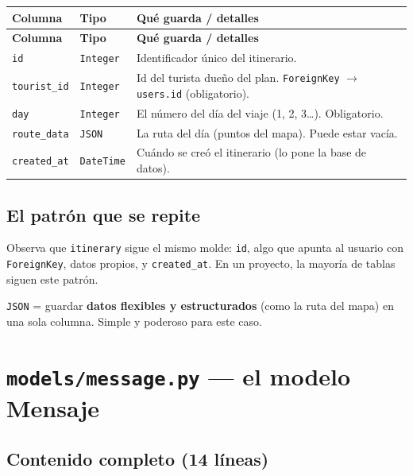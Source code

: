 \documentclass[11pt,a4paper]{article}
\begin{document}
\begin{center}
{\small
\setlength{\tabcolsep}{4pt}
\begin{longtable}{@{}>{\raggedright\arraybackslash}p{3.4cm}>{\raggedright\arraybackslash}p{3cm}>{\raggedright\arraybackslash}p{8.5cm}@{}}
\toprule
\textbf{Columna} & \textbf{Tipo} & \textbf{Qué guarda / detalles} \\
\midrule
\endfirsthead
\toprule
\textbf{Columna} & \textbf{Tipo} & \textbf{Qué guarda / detalles} \\
\midrule
\endhead
\texttt{id} & \texttt{Integer} & Identificador único del itinerario. \\
\texttt{tourist\_id} & \texttt{Integer} & Id del turista dueño del plan. \texttt{ForeignKey} $\rightarrow$ \texttt{users.id} (obligatorio). \\
\texttt{day} & \texttt{Integer} & El número del día del viaje (1, 2, 3\ldots). Obligatorio. \\
\texttt{route\_data} & \texttt{JSON} & La ruta del día (puntos del mapa). Puede estar vacía. \\
\texttt{created\_at} & \texttt{DateTime} & Cuándo se creó el itinerario (lo pone la base de datos). \\
\bottomrule
\end{longtable}
}
\end{center}

\subsection{El patrón que se repite}

Observa que \texttt{itinerary} sigue el mismo molde: \texttt{id}, algo que apunta al usuario
con \texttt{ForeignKey}, datos propios, y \texttt{created\_at}. En un proyecto, la mayoría de
tablas siguen este patrón.

\begin{recuadro}
\texttt{JSON} = guardar \textbf{datos flexibles y estructurados} (como la ruta del mapa)
en una sola columna. Simple y poderoso para este caso.
\end{recuadro}

\section{\texttt{models/message.py} --- el modelo Mensaje}

\subsection{Contenido completo (14 líneas)}
\end{document}
